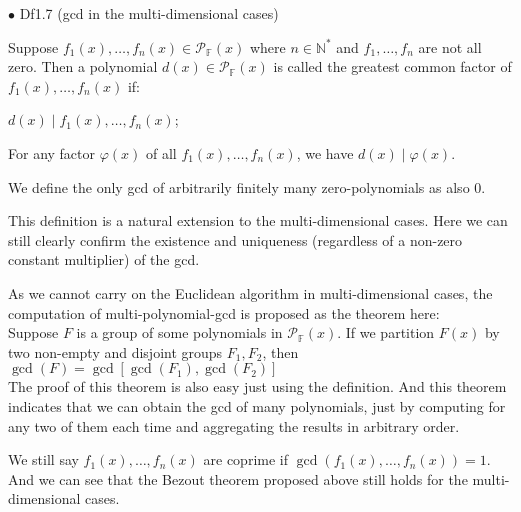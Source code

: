 \documentclass{article}
\begin{document}
\begin{Df}{$\bullet$ Df1.7 (gcd in the multi-dimensional cases)}
    \begin{compactitem}
        \item Suppose $f_1(x), \dots, f_n(x)\in\mathcal{P}_\mathbb{F}(x)$ where $n\in\mathbb{N}^\ast$ and $f_1, \dots, f_n$ are not all zero. Then a polynomial $d(x)\in\mathcal{P}_\mathbb{F}(x)$ is called the greatest common factor of $f_1(x), \dots, f_n(x)$ if:
        \begin{compactenum}
            \item $d(x)\mid f_1(x), \dots, f_n(x)$;
            \item For any factor $\varphi(x)$ of all $f_1(x), \dots, f_n(x)$, we have $d(x)\mid \varphi(x)$.
        \end{compactenum}
        \item We define the only gcd of arbitrarily finitely many zero-polynomials as also $0$.
    \end{compactitem}
\end{Df}

\begin{Rmk}{}
    \begin{compactitem}
        \item This definition is a natural extension to the multi-dimensional cases. \textcolor{Th}{Here we can still clearly confirm the existence and uniqueness (regardless of a non-zero constant multiplier) of the gcd.}
        \item As we cannot carry on the Euclidean algorithm in multi-dimensional cases, the computation of multi-polynomial-gcd is proposed as the theorem here:\\
        \textcolor{Th}{Suppose $F$ is a group of some polynomials in $\mathcal{P}_\mathbb{F}(x)$. If we partition $F(x)$ by two non-empty and disjoint groups $F_1, F_2$, then $\gcd(F) = \gcd[\gcd(F_1), \gcd(F_2)]$}\\
        The proof of this theorem is also easy just using the definition. And this theorem indicates that we can obtain the gcd of many polynomials, just by computing for any two of them each time and aggregating the results in arbitrary order.
        \item \textcolor{Df}{We still say $f_1(x), \dots, f_n(x)$ are coprime if $\gcd(f_1(x), \dots, f_n(x)) = 1$.} And we can see that \textcolor{Th}{the Bezout theorem proposed above still holds for the multi-dimensional cases.}
    \end{compactitem}
\end{Rmk}
\end{document}
